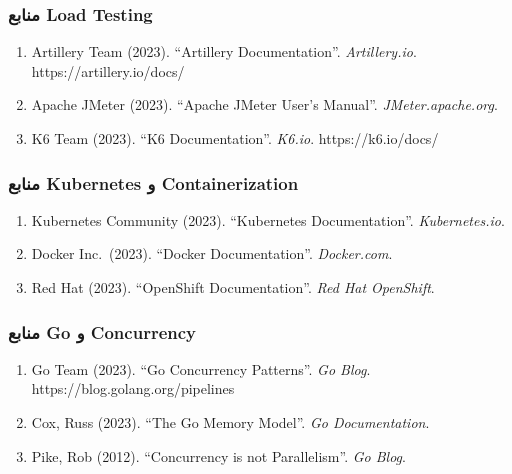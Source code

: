 \documentclass[
]{article}
\begin{document}
\subsubsection{منابع Load
Testing}\label{ux645ux646ux627ux628ux639-load-testing}

\begin{enumerate}
\def\labelenumi{\arabic{enumi}.}
\setcounter{enumi}{27}
\item
  Artillery Team (2023). ``Artillery Documentation''.
  \emph{Artillery.io}. https://artillery.io/docs/
\item
  Apache JMeter (2023). ``Apache JMeter User's Manual''.
  \emph{JMeter.apache.org}.
\item
  K6 Team (2023). ``K6 Documentation''. \emph{K6.io}.
  https://k6.io/docs/
\end{enumerate}

\subsubsection{منابع Kubernetes و
Containerization}\label{ux645ux646ux627ux628ux639-kubernetes-ux648-containerization}

\begin{enumerate}
\def\labelenumi{\arabic{enumi}.}
\setcounter{enumi}{30}
\item
  Kubernetes Community (2023). ``Kubernetes Documentation''.
  \emph{Kubernetes.io}.
\item
  Docker Inc.~(2023). ``Docker Documentation''. \emph{Docker.com}.
\item
  Red Hat (2023). ``OpenShift Documentation''. \emph{Red Hat OpenShift}.
\end{enumerate}

\subsubsection{منابع Go و
Concurrency}\label{ux645ux646ux627ux628ux639-go-ux648-concurrency}

\begin{enumerate}
\def\labelenumi{\arabic{enumi}.}
\setcounter{enumi}{33}
\item
  Go Team (2023). ``Go Concurrency Patterns''. \emph{Go Blog}.
  https://blog.golang.org/pipelines
\item
  Cox, Russ (2023). ``The Go Memory Model''. \emph{Go Documentation}.
\item
  Pike, Rob (2012). ``Concurrency is not Parallelism''. \emph{Go Blog}.
\end{enumerate}
\end{document}
